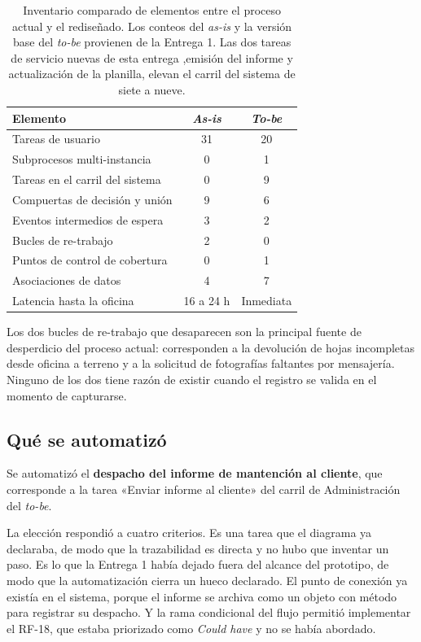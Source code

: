 \documentclass[10pt,letterpaper]{article}
\begin{document}
\begin{table}[H]
\centering
\small
\begin{tabular}{@{}p{6.2cm}cc@{}}
\toprule
\textbf{Elemento} & \textbf{\emph{As-is}} & \textbf{\emph{To-be}} \\
\midrule
Tareas de usuario & 31 & 20 \\
Subprocesos multi-instancia & 0 & 1 \\
Tareas en el carril del sistema & 0 & 9 \\
Compuertas de decisión y unión & 9 & 6 \\
Eventos intermedios de espera & 3 & 2 \\
Bucles de re-trabajo & 2 & 0 \\
Puntos de control de cobertura & 0 & 1 \\
Asociaciones de datos & 4 & 7 \\
Latencia hasta la oficina & 16 a 24 h & Inmediata \\
\bottomrule
\end{tabular}
\caption{Inventario comparado de elementos entre el proceso actual y el
rediseñado. Los conteos del \emph{as-is} y la versión base del \emph{to-be}
provienen de la Entrega 1. Las dos tareas de servicio nuevas de esta entrega
,emisión del informe y actualización de la planilla, elevan el carril del
sistema de siete a nueve.}
\end{table}

Los dos bucles de re-trabajo que desaparecen son la principal fuente de
desperdicio del proceso actual: corresponden a la devolución de hojas
incompletas desde oficina a terreno y a la solicitud de fotografías faltantes
por mensajería. Ninguno de los dos tiene razón de existir cuando el registro se
valida en el momento de capturarse.

\subsection{Qué se automatizó}

Se automatizó el \textbf{despacho del informe de mantención al cliente}, que
corresponde a la tarea «Enviar informe al cliente» del carril de
Administración del \emph{to-be}.

La elección respondió a cuatro criterios. Es una tarea que el diagrama ya
declaraba, de modo que la trazabilidad es directa y no hubo que inventar un
paso. Es lo que la Entrega 1 había dejado fuera del alcance del
prototipo, de modo que la automatización cierra un hueco declarado. El punto de
conexión ya existía en el sistema, porque el informe se archiva como un objeto
con método para registrar su despacho. Y la rama condicional del flujo permitió
implementar el RF-18, que estaba priorizado como \emph{Could have} y no se
había abordado.
\newpage
\end{document}
